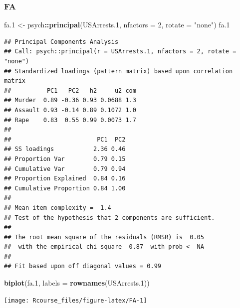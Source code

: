 \documentclass[]{book}
\newenvironment{Shaded}{\begin{snugshade}}{\end{snugshade}}
\newcommand{\KeywordTok}[1]{\textcolor[rgb]{0.13,0.29,0.53}{\textbf{#1}}}
\newcommand{\DataTypeTok}[1]{\textcolor[rgb]{0.13,0.29,0.53}{#1}}
\newcommand{\DecValTok}[1]{\textcolor[rgb]{0.00,0.00,0.81}{#1}}
\newcommand{\StringTok}[1]{\textcolor[rgb]{0.31,0.60,0.02}{#1}}
\newcommand{\CommentTok}[1]{\textcolor[rgb]{0.56,0.35,0.01}{\textit{#1}}}
\newcommand{\OperatorTok}[1]{\textcolor[rgb]{0.81,0.36,0.00}{\textbf{#1}}}
\newcommand{\NormalTok}[1]{#1}
\theoremstyle{definition}
\theoremstyle{definition}
\theoremstyle{definition}
\theoremstyle{remark}
\begin{document}
\subsubsection{FA}\label{fa}

\begin{Shaded}
\begin{Highlighting}[]
\NormalTok{fa.}\DecValTok{1}\NormalTok{ <-}\StringTok{ }\NormalTok{psych}\OperatorTok{::}\KeywordTok{principal}\NormalTok{(USArrests.}\DecValTok{1}\NormalTok{, }\DataTypeTok{nfactors =} \DecValTok{2}\NormalTok{, }\DataTypeTok{rotate =} \StringTok{"none"}\NormalTok{)}
\NormalTok{fa.}\DecValTok{1}
\end{Highlighting}
\end{Shaded}

\begin{verbatim}
## Principal Components Analysis
## Call: psych::principal(r = USArrests.1, nfactors = 2, rotate = "none")
## Standardized loadings (pattern matrix) based upon correlation matrix
##          PC1   PC2   h2     u2 com
## Murder  0.89 -0.36 0.93 0.0688 1.3
## Assault 0.93 -0.14 0.89 0.1072 1.0
## Rape    0.83  0.55 0.99 0.0073 1.7
## 
##                        PC1  PC2
## SS loadings           2.36 0.46
## Proportion Var        0.79 0.15
## Cumulative Var        0.79 0.94
## Proportion Explained  0.84 0.16
## Cumulative Proportion 0.84 1.00
## 
## Mean item complexity =  1.4
## Test of the hypothesis that 2 components are sufficient.
## 
## The root mean square of the residuals (RMSR) is  0.05 
##  with the empirical chi square  0.87  with prob <  NA 
## 
## Fit based upon off diagonal values = 0.99
\end{verbatim}

\begin{Shaded}
\begin{Highlighting}[]
\KeywordTok{biplot}\NormalTok{(fa.}\DecValTok{1}\NormalTok{, }\DataTypeTok{labels =}  \KeywordTok{rownames}\NormalTok{(USArrests.}\DecValTok{1}\NormalTok{)) }
\end{Highlighting}
\end{Shaded}

\texttt{[image: Rcourse\_files/figure-latex/FA-1]}

\begin{Shaded}
\end{Shaded}
\end{document}
